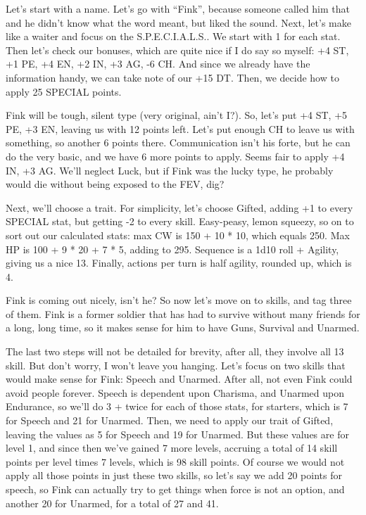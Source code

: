 \documentclass[11pt]{article} %
\begin{document}
Let's start with a name. Let's go with ``Fink'', because someone called him that and he didn't know what the word meant, but liked the sound. Next, let's make like a waiter and focus on the S.P.E.C.I.A.L.S.. We start with 1 for each stat. Then let's check our bonuses, which are quite nice if I do say so myself: +4 ST, +1 PE, +4 EN, +2 IN, +3 AG, -6 CH. And since we already have the information handy, we can take note of our +15 DT. Then, we decide how to apply 25 SPECIAL points. 

Fink will be tough, silent type (very original, ain't I?). So, let's put +4 ST, +5 PE, +3 EN, leaving us with 12 points left. Let's put enough CH to leave us with something, so another 6 points there. Communication isn't his forte, but he can do the very basic, and we have 6 more points to apply. Seems fair to apply +4 IN, +3 AG. We'll neglect Luck, but if Fink was the lucky type, he probably would die without being exposed to the FEV, dig? 

Next, we'll choose a trait. For simplicity, let's choose Gifted, adding +1 to every SPECIAL stat, but getting -2 to every skill. Easy-peasy, lemon squeezy, so on to sort out our calculated stats: max CW is 150 + 10 * 10, which equals 250. Max HP is 100 + 9 * 20 + 7 * 5, adding to 295. Sequence is a 1d10 roll + Agility, giving us a nice 13. Finally, actions per turn is half agility, rounded up, which is 4.

Fink is coming out nicely, isn't he? So now let's move on to skills, and tag three of them. Fink is a former soldier that has had to survive without many friends for a long, long time, so it makes sense for him to have Guns, Survival and Unarmed. 

The last two steps will not be detailed for brevity, after all, they involve all 13 skill. But don't worry, I won't leave you hanging. Let's focus on two skills that would make sense for Fink: Speech and Unarmed. After all, not even Fink could avoid people forever. Speech is dependent upon Charisma, and Unarmed upon Endurance, so we'll do 3 + twice for each of those stats, for starters, which is 7 for Speech and 21 for Unarmed. Then, we need to apply our trait of Gifted, leaving the values as 5 for Speech and 19 for Unarmed. But these values are for level 1, and since then we've gained 7 more levels, accruing a total of 14 skill points per level times 7 levels, which is 98 skill points. Of course we would not apply all those points in just these two skills, so let's say we add 20 points for speech, so Fink can actually try to get things when force is not an option, and another 20 for Unarmed, for a total of 27 and 41. 
\end{document}
